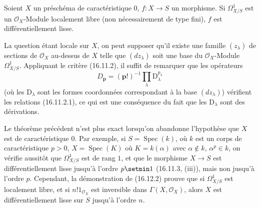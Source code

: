 \begin{theorem}[16.12.2]
\label{IV.16.12.2}
Soient $X$ un préschéma de caractéristique $0$, $f:X\to S$ un morphisme. Si
$\varOmega_{X/S}^1$ est un $\mathcal{O}_X$-Module localement libre (non
nécessairement de type fini), $f$ est différentiellement lisse.
\end{theorem}

La question étant locale sur $X$, on peut supposer qu'il existe une famille
$(z_\lambda)$ de sections de $\mathcal{O}_X$ au-dessus de $X$ telle que
$(dz_\lambda)$ soit une base du $\mathcal{O}_X$-Module $\varOmega_{X/S}^1$.
Appliquant le critère (16.11.2), il suffit de remarquer que les opérateurs
\[
  D_{\mathbf{p}}=(\mathbf{p}!)^{-1}
  \prod_\lambda \mathrm{D}_\lambda^{p_\lambda}
\]
(où les $\mathrm{D}_\lambda$ sont les formes coordonnées correspondant à la base
$(dz_\lambda)$) vérifient les relations (16.11.2.1), ce qui est une
conséquence du fait que les $\mathrm{D}_\lambda$ sont des dérivations.

\begin{env}[16.12.3]
\label{IV.16.12.3}
Le théorème précédent n'est plus exact lorsqu'on abandonne l'hypothèse que
$X$ est de caractéristique $0$. Par exemple, si
$S=\operatorname{Spec}(k)$, où $k$ est un corps de caractéristique $p>0$,
$X=\operatorname{Spec}(K)$ où $K=k(\alpha)$ avec
$\alpha\notin k$, $\alpha^p\in k$, on vérifie aussitôt
que $\varOmega_{X/S}^1$ est de rang $1$, et que le morphisme $X\to S$ est
différentiellement lisse jusqu'à l'ordre $p\setmin 1$ (16.11.3, (iii)), mais non
jusqu'à l'ordre $p$. Cependant, la démonstration de (16.12.2) prouve que si
$\varOmega_{X/S}^1$ est localement libre, et si $n!1_{\mathcal{O}_X}$ est
inversible dans $\Gamma(X,\mathcal{O}_X)$, alors $X$ est différentiellement
lisse sur $S$ jusqu'à l'ordre $n$.
\end{env}
